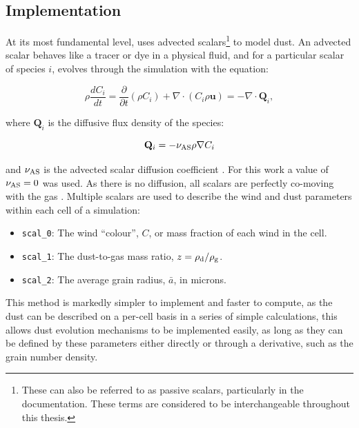 \subsection{Implementation}
\label{sec:dustimplementation}

At its most fundamental level, \bidmas{} uses advected scalars\footnote{These can also be referred to as passive scalars, particularly in the \athena{} documentation. These terms are considered to be interchangeable throughout this thesis.} to model dust.
An advected scalar behaves like a tracer or dye in a physical fluid, and for a particular scalar of species $i$, evolves through the simulation with the equation:

\begin{equation}
  \label{eq:advection}
  \rho \frac{dC_i}{dt} = \frac{\partial}{\partial t} \left( \rho C_i \right) + \nabla \cdot \left( C_i \rho \mathbf{u} \right) = -\nabla \cdot \mathbf{Q}_i ,  
\end{equation}

\noindent
where $\mathbf{Q}_i$ is the diffusive flux density of the species:

\begin{equation}
  \mathbf{Q}_i = - \nu_\text{AS} \rho \nabla C_i
\end{equation}

\noindent
and $\nu_\text{AS}$ is the advected scalar diffusion coefficient \parencite{stoneAthenaAdaptiveMesh2020}.
For this work a value of $\nu_\text{AS} = 0$ was used.
As there is no diffusion, all scalars are perfectly co-moving with the gas \parencite[Ch.~10]{toro_riemann_2013}.
Multiple scalars are used to describe the wind and dust parameters within each cell of a simulation:

\begin{itemize}
  \item \texttt{scal\_0}: The wind ``colour'', $C$, or mass fraction of each wind in the cell. 
  \item \texttt{scal\_1}: The dust-to-gas mass ratio, $z = \rho_\text{d}/\rho_\text{g}$.
  \item \texttt{scal\_2}: The average grain radius, $\bar{a}$, in microns.
\end{itemize}

\noindent
This method is markedly simpler to implement and faster to compute, as the dust can be described on a per-cell basis in a series of simple calculations, this allows dust evolution mechanisms to be implemented easily, as long as they can be defined by these parameters either directly or through a derivative, such as the grain number density.

